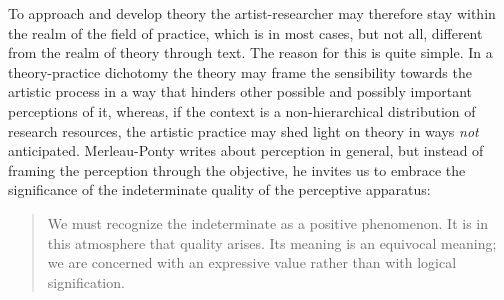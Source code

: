 \documentclass[12pt]{article}
\begin{document}

To approach and develop theory the artist-researcher may therefore stay within the realm of the field of practice, which is in most cases, but not all, different from the realm of theory through text. The reason for this is quite simple. In a theory-practice dichotomy the theory may frame the sensibility towards the artistic process in a way that hinders other possible and possibly important perceptions of it, whereas, if the context is a non-hierarchical distribution of research resources, the artistic practice may shed light on theory in ways \emph{not} anticipated. Merleau-Ponty writes about perception in general, but instead of framing the perception through the objective, he invites us to embrace the significance of the indeterminate quality of the perceptive apparatus:


\begin{quotation}
  We must recognize the indeterminate as a positive phenomenon. It is
  in this atmosphere that quality arises. Its meaning is an equivocal
  meaning; we are concerned with an expressive value rather than with
  logical signification.
\end{quotation}
\end{document}
